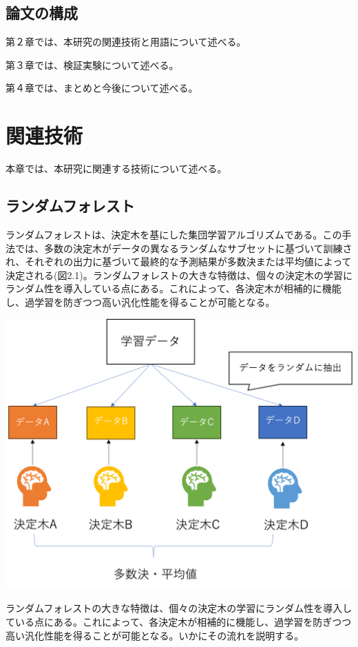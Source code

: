 \documentclass[platex]{suribt}
\begin{document}
\section{論文の構成}
第２章では、本研究の関連技術と用語について述べる。\par
第３章では、検証実験について述べる。\par
第４章では、まとめと今後について述べる。

\chapter{関連技術}
本章では、本研究に関連する技術について述べる。
\section{ランダムフォレスト}
ランダムフォレストは、決定木を基にした集団学習アルゴリズムである。この手法では、多数の決定木がデータの異なるランダムなサブセットに基づいて訓練され、それぞれの出力に基づいて最終的な予測結果が多数決または平均値によって決定される(図2.1)。ランダムフォレストの大きな特徴は、個々の決定木の学習にランダム性を導入している点にある。これによって、各決定木が相補的に機能し、過学習を防ぎつつ高い汎化性能を得ることが可能となる。

\includegraphics[scale=0.6]{randomforest.png}

ランダムフォレストの大きな特徴は、個々の決定木の学習にランダム性を導入している点にある。これによって、各決定木が相補的に機能し、過学習を防ぎつつ高い汎化性能を得ることが可能となる。いかにその流れを説明する。
\end{document}
